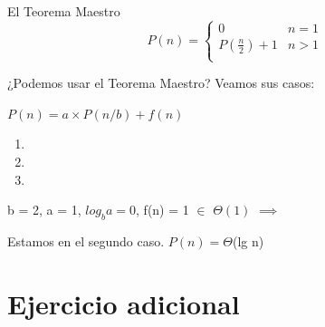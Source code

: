 \documentclass[pdf]{beamer}
\begin{document}
\begin{frame}{El Teorema Maestro}
\[ P(n) =  \begin{cases} 
    0 & n = 1 \\
    P(\frac{n}{2}) + 1 & n > 1 \\ 
   \end{cases}
 \]

 ¿Podemos usar el Teorema Maestro? Veamos sus casos:
 
 \pause
 
 \vspace{0.5em}
 
 \par{$P(n) = a \times P(n/b) + f(n)$}
 
 \vspace{0.5em}
 

 \begin{enumerate}
 
 [circle]
    \item {}
    \item {}
    \item {}
 \end{enumerate}

\pause
\par{b = 2, a = 1, $log_b{a} = 0$, f(n) = 1 $\in$ $\Theta(1)$ $\implies$ }
\par{Estamos en el segundo caso. $P(n) = \Theta$(lg n)}
   

\end{frame}

\section{Ejercicio adicional}
\end{document}
